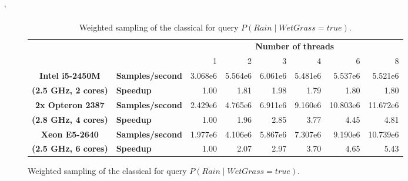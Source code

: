 \documentclass[english,cover]{fitthesis} %
\begin{document}
\begin{table}[htb]
    \begin{center}
    \catcode`
    \begin{adjustwidth}{-0.85cm}{-0.75cm} %
    {\small
    \begin{subfigure}[b]{\linewidth}
        \begin{tabular}{|c|l|r|r|r|r|r|r|}
            \cline{3-8}
            \multicolumn{2}{c|}{} & \multicolumn{6}{c|}{\textbf{Number of threads}}\\
            \cline{3-8}
            \multicolumn{2}{c|}{} & 1 & 2 & 3 & 4 & 6 & 8\\ %
            \hline
            \textbf{Intel i5-2450M} & \textbf{Samples/second}
                & 3.068e6 & 5.564e6 & 6.061e6 & 5.481e6 & 5.537e6 & 5.521e6\\
            \cline{2-8}
            \textbf{(2.5 GHz, 2 cores)} & \textbf{Speedup}
                & 1.00 & 1.81 & 1.98 & 1.79 & 1.80 & 1.80\\
            \hline \hline
            \textbf{2x Opteron 2387} & \textbf{Samples/second}
                & 2.429e6 & 4.765e6 & 6.911e6 & 9.160e6 & 10.803e6 & 11.672e6\\
            \cline{2-8}
            \textbf{(2.8 GHz, 4 cores)} & \textbf{Speedup}
                & 1.00 & 1.96 & 2.85 & 3.77 & 4.45 & 4.81\\
            \hline \hline
            \textbf{Xeon E5-2640} & \textbf{Samples/second}
                & 1.977e6 & 4.106e6 & 5.867e6 & 7.307e6 & 9.190e6 & 10.739e6\\
            \cline{2-8}
            \textbf{(2.5 GHz, 6 cores)} & \textbf{Speedup}
                & 1.00 & 2.07 & 2.97 & 3.70 & 4.65 & 5.43\\
            \hline
        \end{tabular}
        \caption{Weighted sampling of the classical  for query $P(Rain \mid WetGrass = true)$.}
    \end{subfigure}
    
}
\end{adjustwidth}
\end{center}
\end{table}
\end{document}
